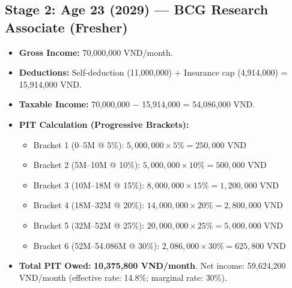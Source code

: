 \subsection{Stage 2: Age 23 (2029) --- BCG Research Associate (Fresher)}
\begin{itemize}
  \item \textbf{Gross Income:} 70,000,000 VND/month.
  \item \textbf{Deductions:} Self-deduction (11,000,000) + Insurance cap (4,914,000) = 15,914,000 VND.
  \item \textbf{Taxable Income:} 70,000,000 $-$ 15,914,000 = 54,086,000 VND.
  \item \textbf{PIT Calculation (Progressive Brackets):}
    \begin{itemize}
      \item Bracket 1 (0--5M @ 5\%): $5{,}000{,}000 \times 5\% = 250{,}000$ VND
      \item Bracket 2 (5M--10M @ 10\%): $5{,}000{,}000 \times 10\% = 500{,}000$ VND
      \item Bracket 3 (10M--18M @ 15\%): $8{,}000{,}000 \times 15\% = 1{,}200{,}000$ VND
      \item Bracket 4 (18M--32M @ 20\%): $14{,}000{,}000 \times 20\% = 2{,}800{,}000$ VND
      \item Bracket 5 (32M--52M @ 25\%): $20{,}000{,}000 \times 25\% = 5{,}000{,}000$ VND
      \item Bracket 6 (52M--54.086M @ 30\%): $2{,}086{,}000 \times 30\% = 625{,}800$ VND
    \end{itemize}
  \item \textbf{Total PIT Owed:} \textbf{10,375,800 VND/month}. Net income: 59,624,200 VND/month (effective rate: 14.8\%; marginal rate: 30\%).
\end{itemize}


